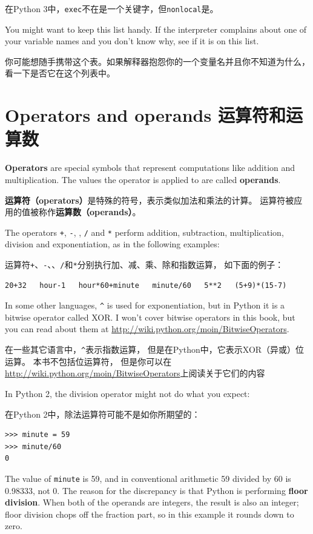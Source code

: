 \documentclass[10pt]{book}
\begin{document}
\begin{CJK}{UTF8}{gbsn}
在Python 3中，{\tt exec}不在是一个关键字，但{\tt nonlocal}是。

You might want to keep this list handy.  If the interpreter complains
about one of your variable names and you don't know why, see if it
is on this list.

你可能想随手携带这个表。如果解释器抱怨你的一个变量名并且你不知道为什么，
看一下是否它在这个列表中。

\section{Operators and operands 运算符和运算数}

{\bf Operators} are special symbols that represent computations like
addition and multiplication.  The values the operator is applied to
are called {\bf operands}.

{\bf 运算符（operators）}是特殊的符号，表示类似加法和乘法的计算。
运算符被应用的值被称作{\bf 运算数（operands）}。

The operators {\tt +}, {\tt -}, {\tt *}, {\tt /} and {\tt **}
perform addition, subtraction, multiplication, division and
exponentiation, as in the following examples:

运算符{\tt +}、{\tt -}、{\tt *}、{\tt /}和{\tt **}分别执行加、减、乘、除和指数运算，
如下面的例子：

\begin{verbatim}
20+32   hour-1   hour*60+minute   minute/60   5**2   (5+9)*(15-7)
\end{verbatim}
%
In some other languages, \verb"^" is used for exponentiation, but
in Python it is a bitwise operator called XOR.  I won't cover
bitwise operators in this book, but you can read about
them at \url{http://wiki.python.org/moin/BitwiseOperators}.

在一些其它语言中，\verb"^"表示指数运算，
但是在Python中，它表示XOR（异或）位运算。
本书不包括位运算符，
但是你可以在\url{http://wiki.python.org/moin/BitwiseOperators}上阅读关于它们的内容

In Python 2, the division operator might not do what you expect:

在Python 2中，除法运算符可能不是如你所期望的：

\begin{verbatim}
>>> minute = 59
>>> minute/60
0
\end{verbatim}
%
The value of {\tt minute} is 59, and in conventional arithmetic 59
divided by 60 is 0.98333, not 0.  The reason for the discrepancy is
that Python is performing {\bf floor division}.
When both of the operands are integers, the result is also an
integer; floor division chops off the fraction
part, so in this example it rounds down to zero.


\end{CJK}
\end{document}
